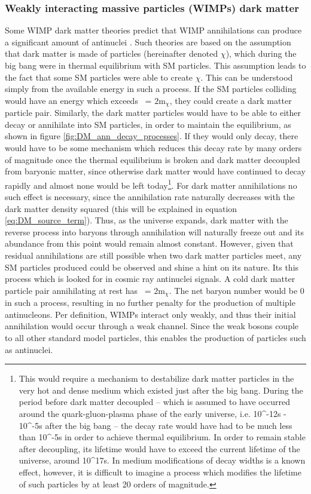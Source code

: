 \subsubsection{Weakly interacting massive particles (WIMPs) dark matter}\label{sec:WIMPS}
Some WIMP dark matter theories predict that WIMP annihilations can produce a significant amount of antinuclei \cite{}. Such theories are based on the assumption that dark matter is made of particles (hereinafter denoted $\chi$), which during the big bang were in thermal equilibrium with SM particles. This assumption leads to the fact that some SM particles were able to create $\chi$. This can be understood simply from the available energy in such a process. If the SM particles colliding would have an energy which exceeds \Vs\ = $2\mathrm{m}_\chi$, they could create a dark matter particle pair. Similarly, the dark matter particles would have to be able to either decay or annihilate into SM particles, in order to maintain the equilibrium, as shown in figure \ref{fig:DM_ann_decay_processes}. If they would only decay, there would have to be some mechanism which reduces this decay rate by many orders of magnitude once the thermal equilibrium is broken and dark matter decoupled from baryonic matter, since otherwise dark matter would have continued to decay rapidly and almost none would be left today\footnote{This would require a mechanism to destabilize dark matter particles in the very hot and dense medium which existed just after the big bang. During the period before dark matter decoupled -- which is assumed to have occurred around the quark-gluon-plasma phase of the early universe, i.e. 10^{-12}s - 10^{-5}s after the big bang -- the decay rate would have had to be much less than 10^{-5}s in order to achieve thermal equilibrium. In order to remain stable after decoupling, its lifetime would have to exceed the current lifetime of the universe, around 10^{17}s. In medium modifications of decay widths is a known effect\cite{}, however, it is difficult to imagine a process which modifies the lifetime of such particles by at least 20 orders of magnitude.}. For dark matter annihilations no such effect is necessary, since the annihilation rate naturally decreases with the dark matter density squared (this will be explained in equation \ref{eq:DM_source_term}). Thus, as the universe expands, dark matter with the reverse process into baryons through annihilation will naturally freeze out and its abundance from this point would remain almost constant. However, given that residual annihilations are still possible when two dark matter particles meet, any SM particles produced could be observed and shine a hint on its nature. Its this process which is looked for in cosmic ray antinuclei signals. A cold dark matter particle pair annihilating at rest has \Vs\ = $2\mathrm{m}_\chi$. The net baryon number would be 0 in such a process, resulting in no further penalty for the production of multiple antinucleons. Per definition, WIMPs interact only weakly, and thus their initial annihilation would occur through a weak channel. Since the weak bosons couple to all other standard model particles, this enables the production of particles such as antinuclei. \\

